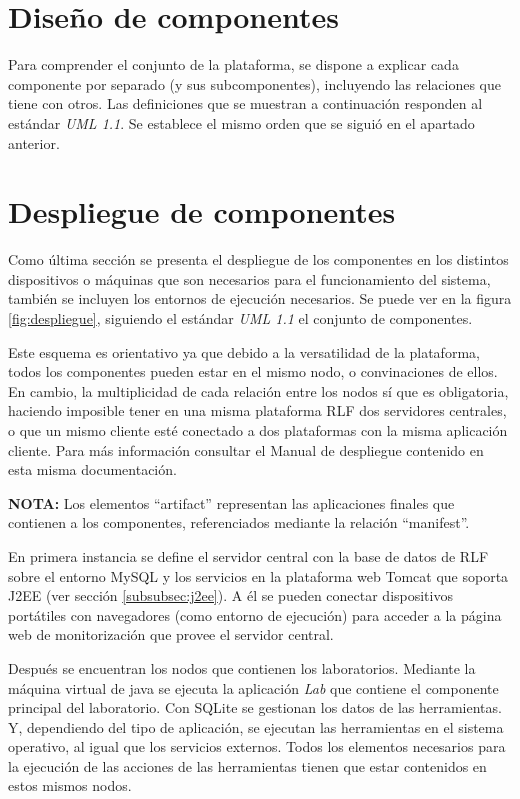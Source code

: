 \section{Diseño de componentes}

Para comprender el conjunto de la plataforma, se dispone a explicar 
cada componente por separado (y sus subcomponentes), incluyendo las 
relaciones que tiene con otros. Las definiciones que se muestran a 
continuación responden al estándar \emph{UML 1.1}. Se establece el mismo 
orden que se siguió en el apartado anterior.



\section{Despliegue de componentes}

Como última sección se presenta el despliegue de los componentes en 
los distintos dispositivos o máquinas que son necesarios para el 
funcionamiento del sistema, también se incluyen los entornos de 
ejecución necesarios. Se puede ver en la figura \ref{fig:despliegue}, 
siguiendo el estándar \emph{UML 1.1} el conjunto de componentes.

Este esquema es orientativo ya que debido a la versatilidad de la 
plataforma, todos los componentes pueden estar en el mismo nodo, o 
convinaciones de ellos. En cambio, la multiplicidad de 
cada relación entre los nodos sí que es obligatoria, haciendo 
imposible tener en una misma plataforma RLF dos servidores centrales, 
o que un mismo cliente esté conectado a dos plataformas con la misma 
aplicación cliente. Para más información consultar el Manual de 
despliegue contenido en esta misma documentación. 

\textbf{NOTA:} Los elementos ``artifact'' representan las aplicaciones 
finales que contienen a los componentes, referenciados mediante la 
relación ``manifest''.

En primera instancia se define el servidor central con la base de 
datos de RLF sobre el entorno MySQL y los servicios en la plataforma 
web Tomcat que soporta J2EE (ver sección \ref{subsubsec:j2ee}). A él 
se pueden conectar dispositivos portátiles con navegadores (como 
entorno de ejecución) para acceder a la página web de monitorización 
que provee el servidor central.

Después se encuentran los nodos que contienen los laboratorios. 
Mediante la máquina virtual de java se ejecuta la aplicación 
\emph{Lab} que contiene el componente principal del laboratorio. Con 
SQLite se gestionan los datos de las herramientas. Y, dependiendo del 
tipo de aplicación, se ejecutan las herramientas en el sistema 
operativo, al igual que los servicios externos. Todos los elementos 
necesarios para la ejecución de las acciones de las herramientas 
tienen que estar contenidos en estos mismos nodos.

